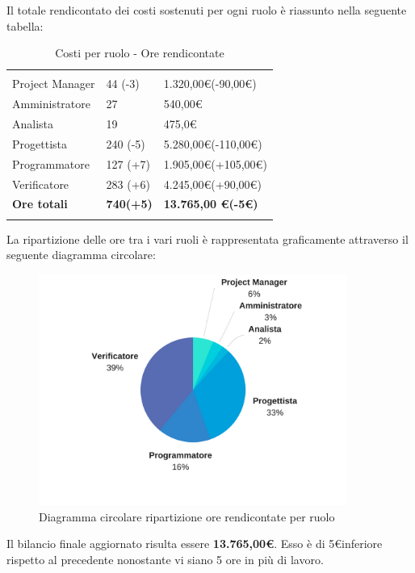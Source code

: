 Il totale rendicontato dei costi sostenuti per ogni ruolo è riassunto nella seguente tabella:
\begin{table}[H]
	\centering
	\begin{tabular}{|p{4cm}|C{4cm}|C{4cm}|}
		
		 & &\\
		Project Manager & 44 (-3) & 1.320,00\euro (-90,00\euro) \\
		\hline
		Amministratore& 27 & 540,00\euro \\
		\hline
		Analista & 19 & 475,0\euro \\
		\hline
		Progettista & 240 (-5) & 5.280,00\euro (-110,00\euro) \\
		\hline
		Programmatore & 127 (+7) & 1.905,00\euro (+105,00\euro) \\
		\hline
		Verificatore & 283 (+6) & 4.245,00\euro (+90,00\euro)\\
		\hline
		\textbf{Ore totali} & \textbf{740(+5)} & \textbf{13.765,00 \euro (-5\euro)} \\
	\end{tabular}
	\caption{Costi per ruolo - Ore rendicontate}
\end{table}

La ripartizione delle ore tra i vari ruoli è rappresentata graficamente attraverso il seguente diagramma circolare:

\begin{figure}[H] 
	\centering 
	\includegraphics[width=0.9\textwidth]{images/CircolareSoloRendicontateNuovo.png} 
	\caption{Diagramma circolare ripartizione ore rendicontate per ruolo}
	\label{CircolareSoloRendicontate}
\end{figure}

Il bilancio finale aggiornato risulta essere \textbf{13.765,00\euro}. Esso è di 5\euro inferiore rispetto al precedente nonostante vi siano 5 ore in più di lavoro.
